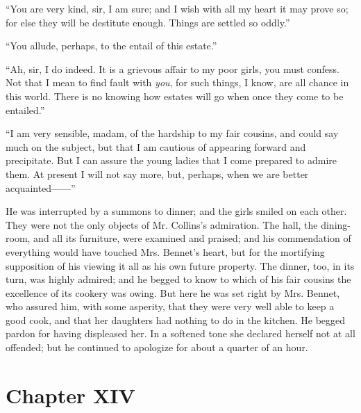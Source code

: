 \documentclass[12pt,openright]{book}
\begin{document}
“You are very kind, sir, I am sure; and I wish with all my heart it may prove so; for else they will be destitute enough. Things are settled so oddly.”

“You allude, perhaps, to the entail of this estate.”

“Ah, sir, I do indeed. It is a grievous affair to my poor girls, you must confess. Not that I mean to find fault with \textit{you}, for such things, I know, are all chance in this world. There is no knowing how estates will go when once they come to be entailed.”

“I am very sensible, madam, of the hardship to my fair cousins, and could say much on the subject, but that I am cautious of appearing forward and precipitate. But I can assure the young ladies that I come prepared to admire them. At present I will not say more, but, perhaps, when we are better acquainted——”

He was interrupted by a summons to dinner; and the girls smiled on each other. They were not the only objects of Mr. Collins’s admiration. The hall, the dining-room, and all its furniture, were examined and praised; and his commendation of everything would have touched Mrs. Bennet’s heart, but for the mortifying supposition of his viewing it all as his own future property. The dinner, too, in its turn, was highly admired; and he begged to know to which of his fair cousins the excellence of its cookery was owing. But here he was set right by Mrs. Bennet, who assured him, with some asperity, that they were very well able to keep a good cook, and that her daughters had nothing to do in the kitchen. He begged pardon for having displeased her. In a softened tone she declared herself not at all offended; but he continued to apologize for about a quarter of an hour.

\chapter{Chapter XIV}
\end{document}
